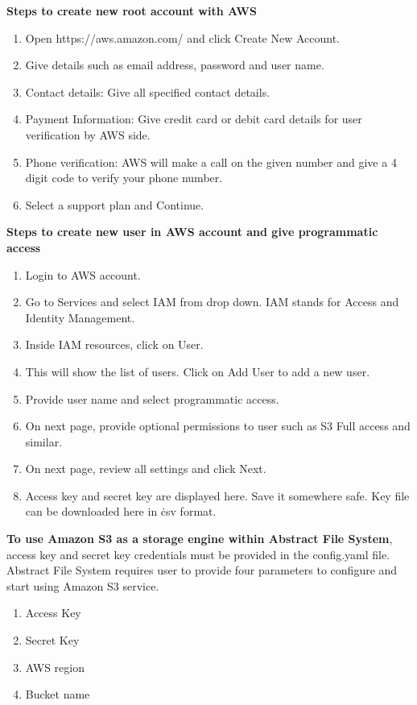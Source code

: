\textbf{Steps to create new root account with AWS}

\begin{enumerate}
    \item Open https://aws.amazon.com/ and click Create New Account.
    \item Give details such as email address, password and user name.
    \item Contact details: Give all specified contact details.
    \item Payment Information: Give credit card or debit card details for user
verification by AWS side.
    \item       Phone verification: AWS will make a call on the given number
and give a 4 digit code to verify your phone number.
    \item Select a support plan and Continue.
\end{enumerate}


\textbf{Steps to create new user in AWS account and give programmatic access}


\begin{enumerate}
    \item Login to AWS account.
    \item Go to Services and select IAM from drop down. 
	IAM stands for Access and Identity Management.
    \item Inside IAM resources, click on User.
    \item This will show the list of users. Click on Add User to add a new 
user.
    \item Provide user name and select programmatic access.
    \item On next page, provide optional permissions to user such as S3 Full
access and similar.
    \item On next page, review all settings and click Next.
    \item Access key and secret key are displayed here. Save it somewhere safe.
Key file can be downloaded here in \.csv format.
\end{enumerate}



\textbf{To use Amazon S3 as a storage engine within Abstract File System}, 
access key and secret key credentials must be provided 
in the config.yaml file. Abstract File System requires user to 
provide four parameters to configure and start using Amazon S3 service.

\begin{enumerate}
 \item  Access Key
 \item  Secret Key
 \item  AWS region
 \item  Bucket name
\end{enumerate}


